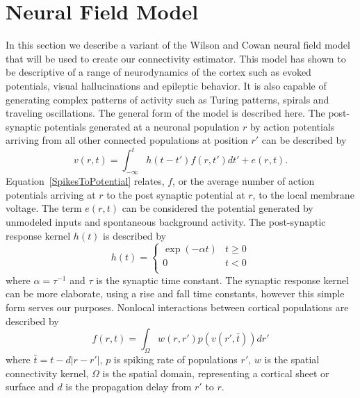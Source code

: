\documentclass[onecolumn,draftcls]{IEEEtran}
\begin{document}
\section{Neural Field Model}
In this section we describe a variant of the  Wilson and Cowan neural field model~\cite{Wilson1973} that will be used to create our connectivity estimator. This model has shown to be descriptive of a range of neurodynamics of the cortex such as evoked potentials, visual hallucinations and epileptic behavior. It is also capable of generating complex patterns of activity such as Turing patterns, spirals and traveling oscillations. The general form of the model is described here. The post-synaptic potentials generated at a neuronal population $r$ by action potentials arriving from all other connected populations at position $r'$ can be described by
\begin{equation}\label{SpikesToPotential}
v\left( {r,t} \right) = \int_{ - \infty }^t {h\left( {t - t'} \right)f\left( {r,t'} \right)dt'} + e\left( {r,t} \right).
\end{equation}
Equation~\ref{SpikesToPotential} relates, $f$, or the average number of action potentials arriving at $r$ to the post synaptic potential at $r$, to the local membrane voltage. The term $e(r,t)$ can be considered the potential generated by unmodeled inputs and spontaneous background activity. The post-synaptic response kernel $h(t)$ is described by
\begin{equation}\label{SynapticRespKernel}
h(t) = \left\{ {\begin{array}{*{20}{c}}
   {\exp ( - \alpha t)} & {t \ge 0}  \\
   0 & {t < 0}  \\
\end{array}} \right.
\end{equation}
where $\alpha=\tau^{-1}$ and $\tau$ is the synaptic time constant. The synaptic response kernel can be more elaborate, using a rise and fall time constants, however this simple form serves our purposes. Nonlocal interactions between cortical populations are described by	
\begin{equation}\label{RateBasedInteractions}
f\left( {r,t} \right) = \int_\Omega  {w\left( {r,r'} \right)p\left( {v\left( {r',\bar t} \right)} \right)dr'}
\end{equation}
where $\bar t = t - d\left| {r - r'} \right|$, $p$ is spiking rate of populations $r'$, $w$ is the spatial connectivity kernel, $\Omega$ is the spatial domain, representing a cortical sheet or surface and $d$ is the propagation delay from $r'$ to $r$.
\end{document}
